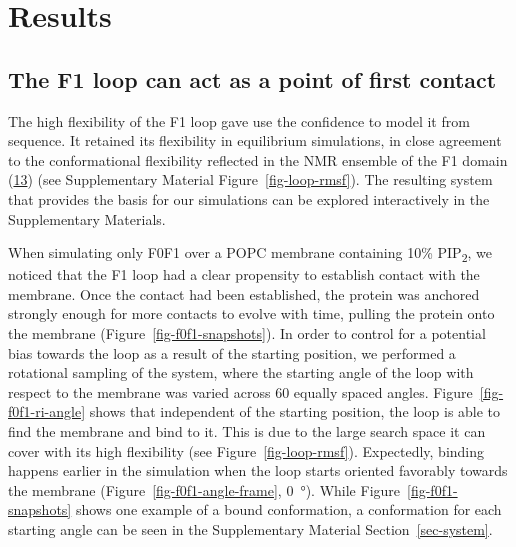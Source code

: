 \documentclass[
  twocolumn]{biophys-new-mod}
\begin{document}
\hypertarget{results}{%
\section{Results}\label{results}}

\hypertarget{the-f1-loop-can-act-as-a-point-of-first-contact}{%
\subsection{The F1 loop can act as a point of first
contact}\label{the-f1-loop-can-act-as-a-point-of-first-contact}}

The high flexibility of the F1 loop gave use the confidence to model it
from sequence. It retained its flexibility in equilibrium simulations, in close agreement to the conformational flexibility reflected in the NMR ensemble of the F1 domain 
(\protect\hyperlink{ref-goultStructureDoubleUbiquitinlike2010}{13}) (see Supplementary Material
Figure~\ref{fig-loop-rmsf}). The resulting system that provides the
basis for our simulations can be explored interactively in the
Supplementary Materials.

When simulating only F0F1 over a POPC membrane containing 10\%
PIP\textsubscript{2}, we noticed that the F1 loop had a clear propensity
to establish contact with the membrane. Once the contact had been
established, the protein was anchored strongly enough for more contacts
to evolve with time, pulling the protein onto the membrane
(Figure~\ref{fig-f0f1-snapshots}). In order to control for a potential
bias towards the loop as a result of the starting position, we performed
a rotational sampling of the system, where the starting angle of the
loop with respect to the membrane was varied across 60 equally spaced
angles. Figure~\ref{fig-f0f1-ri-angle} shows that independent of the
starting position, the loop is able to find the membrane and bind to it.
This is due to the large search space it can cover with its high
flexibility (see Figure~\ref{fig-loop-rmsf}). Expectedly, binding happens earlier in
the simulation when the loop starts oriented favorably towards the
membrane (Figure~\ref{fig-f0f1-angle-frame}, 0~°). While
Figure~\ref{fig-f0f1-snapshots} shows one example of a bound
conformation, a conformation for each starting angle can be seen in the
Supplementary Material Section~\ref{sec-system}.
\end{document}
